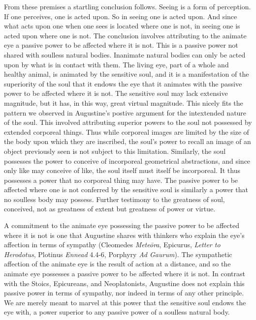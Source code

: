 \documentclass[12pt]{article}
\begin{document}
From these premises a startling conclusion follows. Seeing is a form of perception. If one perceives, one is acted upon. So in seeing one is acted upon. And since what acts upon one when one sees is located where one is not, in seeing one is acted upon where one is not. The conclusion involves attributing to the animate eye a passive power to be affected where it is not. This is a passive power not shared with soulless natural bodies. Inanimate natural bodies can only be acted upon by what is in contact with them. The living eye, part of a whole and healthy animal, is animated by the sensitive soul, and it is a manifestation of the superiority of the soul that it endows the eye that it animates with the passive power to be affected where it is not. The sensitive soul may lack extensive magnitude, but it has, in this way, great virtual magnitude. This nicely fits the pattern we observed in Augustine's postive argument for the intextended nature of the soul. This involved attributing superior powers to the soul not possessed by extended corporeal things. Thus while corporeal images are limited by the size of the body upon which they are inscribed, the soul's power to recall an image of an object previously seen is not subject to this limitation. Similarly, the soul possesses the power to conceive of incorporeal geometrical abstractions, and since only like may conceive of like, the soul itself must itself be incorporeal. It thus possesses a power that no corporeal thing may have. The passive power to be affected where one is not conferred by the sensitive soul is similarly a power that no soulless body may possess. Further testimony to the greatness of soul, conceived, not as greatness of extent but greatness of power or virtue.

A commitment to the animate eye possessing the passive power to be affected where it is not is one that Augustine shares with thinkers who explain the eye's affection in terms of sympathy (Cleomedes \emph{Meteōra}, Epicurus, \emph{Letter to Herodotus}, Plotinus \emph{Ennead} 4.4-6, Porphyry \emph{Ad Gaurum}). The sympathetic affection of the animate eye is the result of action at a distance, and so the animate eye possesses a passive power to be affected where it is not. In contrast with the Stoics, Epicureans, and Neoplatonists, Augustine does not explain this passive power in terms of sympathy, nor indeed in terms of any other principle. We are merely meant to marvel at this power that the sensitive soul endows the eye with, a power superior to any passive power of a soulless natural body.
\end{document}
